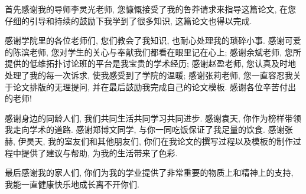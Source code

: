 
\begin{acknowledgements}
  首先感谢我的导师李灵光老师, 您慷慨接受了我的鲁莽请求来指导这篇论文, 在您仔细的引导和持续的鼓励下我学到了很多知识, 这篇论文也得以完成.

  感谢学院里的各位老师们, 您们教会了我知识, 也耐心处理我的琐碎小事. 感谢可爱的陈滨老师, 您对学生的关心与奉献我们都看在眼里记在心上; 感谢余斌老师, 您所提供的低维拓扑讨论班的平台是我宝贵的学术经历; 感谢赵盈老师, 您认真及时地处理了我的每一次诉求, 使我感受到了学院的温暖; 感谢张莉老师, 您一直容忍我关于论文排版的无理提问, 并在最后鼓励我完成自己的论文模板. 感谢各位辛苦付出的老师!

  感谢身边的同龄人们, 我们共同生活共同学习共同进步. 感谢袁天, 你作为榜样带领我走向学术的道路. 感谢郑博文同学, 与你一同吃饭保证了我足量的饮食. 感谢张赫, 伊昊天, 我的室友们和其他朋友们, 你们在我论文的撰写过程以及模板的制作过程中提供了建议与帮助, 为我的生活带来了色彩.

  最后感谢我的家人们, 你们为我的学业提供了非常重要的物质上和精神上的支持, 我能一直健康快乐地成长离不开你们.
%
\end{acknowledgements}

